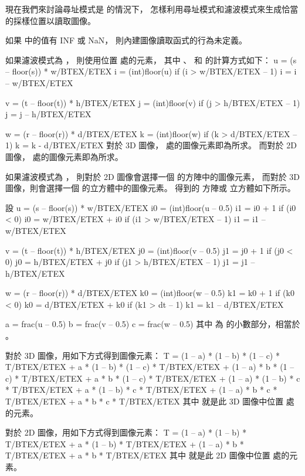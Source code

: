 現在我們來討論尋址模式是  的情況下，
怎樣利用尋址模式和濾波模式來生成恰當的採樣位置以讀取圖像。

如果  中的值有 INF 或 NaN，
則內建圖像讀取函式的行為未定義。

{}

如果濾波模式為 ，
則使用位置  處的元素，
其中 、  和  的計算方式如下：
\startclc[indentnext=no]
u = (s – floor(s)) * w/BTEX/ETEX
i = (int)floor(u)
if (i > w/BTEX/ETEX – 1)
	i = i – w/BTEX/ETEX

v = (t – floor(t)) * h/BTEX/ETEX
j = (int)floor(v)
if (j > h/BTEX/ETEX – 1)
	j = j – h/BTEX/ETEX

w = (r – floor(r)) * d/BTEX/ETEX
k = (int)floor(w)
if (k > d/BTEX/ETEX – 1)
	k = k - d/BTEX/ETEX
\stopclc
對於 3D 圖像，  處的圖像元素即為所求。
而對於 2D 圖像，  處的圖像元素即為所求。

{}

如果濾波模式為 ，
則對於 2D 圖像會選擇一個  的方陣中的圖像元素，
而對於 3D 圖像，則會選擇一個  的立方體中的圖像元素。
得到的  方陣或  立方體如下所示。

設
\startclc[indentnext=no]
u = (s – floor(s)) * w/BTEX/ETEX
i0 = (int)floor(u – 0.5)
i1 = i0 + 1
if (i0 < 0)
	i0 = w/BTEX/ETEX + i0
if (i1 > w/BTEX/ETEX – 1)
	i1 = i1 – w/BTEX/ETEX

v = (t – floor(t)) * h/BTEX/ETEX
j0 = (int)floor(v – 0.5)
j1 = j0 + 1
if (j0 < 0)
	j0 = h/BTEX/ETEX + j0
if (j1 > h/BTEX/ETEX – 1)
	j1 = j1 – h/BTEX/ETEX

w = (r – floor(r)) * d/BTEX/ETEX
k0 = (int)floor(w – 0.5)
k1 = k0 + 1
if (k0 < 0)
	k0 = d/BTEX/ETEX + k0
if (k1 > dt – 1)
	k1 = k1 – d/BTEX/ETEX

a = frac(u – 0.5)
b = frac(v – 0.5)
c = frac(w – 0.5)
\stopclc
其中  為  的小數部分，相當於 。

對於 3D 圖像，用如下方式得到圖像元素：
\startclc[indentnext=no]
T = (1 – a) * (1 – b) * (1 – c) * T/BTEX/ETEX
    + a * (1 – b) * (1 – c) * T/BTEX/ETEX
    + (1 – a) * b * (1 – c) * T/BTEX/ETEX
    + a * b * (1 – c) * T/BTEX/ETEX
    + (1 – a) * (1 – b) * c * T/BTEX/ETEX
    + a * (1 – b) * c * T/BTEX/ETEX
    + (1 – a) * b * c * T/BTEX/ETEX
    + a * b * c * T/BTEX/ETEX
\stopclc
其中  就是此 3D 圖像中位置  處的元素。

對於 2D 圖像，用如下方式得到圖像元素：
\startclc[indentnext=no]
T = (1 – a) * (1 – b) * T/BTEX/ETEX
    + a * (1 – b) * T/BTEX/ETEX
    + (1 – a) * b * T/BTEX/ETEX
    + a * b * T/BTEX/ETEX
\stopclc
其中  就是此 2D 圖像中位置  處的元素。
